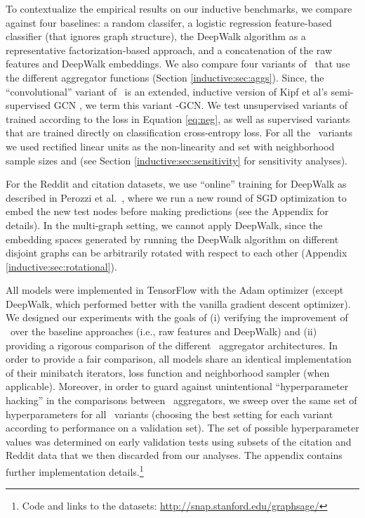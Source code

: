 To contextualize the empirical results on our inductive benchmarks, we compare against four baselines: 
a random classifer, a logistic regression feature-based classifier (that ignores graph structure), the DeepWalk algorithm \cite{perozzi2014deepwalk} as a representative factorization-based approach, and a
concatenation of the raw features and DeepWalk embeddings.
We also compare four variants of \name\ that use the different aggregator functions (Section \ref{inductive:sec:aggs}).
Since, the ``convolutional'' variant of \name\ is an extended, inductive version of Kipf et al's semi-supervised GCN \cite{kipf2016semi}, we term this variant \name-GCN.
We test unsupervised variants of \name\, trained according to the loss in Equation \eqref{eq:neg}, as well as supervised variants that are trained directly on classification cross-entropy loss.
For all the \name\ variants we used rectified linear units as the non-linearity and set  with neighborhood sample sizes  and  (see Section \ref{inductive:sec:sensitivity} for sensitivity analyses).

For the Reddit and citation datasets, we use ``online'' training for DeepWalk as described in Perozzi et al.~\cite{perozzi2014deepwalk}, where we run a new round of SGD optimization to embed the new test nodes before making predictions (see the Appendix for details).
In the multi-graph setting, we cannot apply DeepWalk, since the embedding spaces generated by running the DeepWalk algorithm on different disjoint graphs can be arbitrarily rotated with respect to each other (Appendix \ref{inductive:sec:rotational}). 



All models were implemented in TensorFlow \cite{abadi2016tensorflow} with the Adam optimizer \cite{kingma2014adam} (except DeepWalk, which performed better with the vanilla gradient descent optimizer). 
We designed our experiments with the goals of (i) verifying the improvement of \name\ over the baseline approaches (i.e., raw features and DeepWalk) and (ii) providing a rigorous comparison of the different \name\ aggregator architectures. 
In order to provide a fair comparison, all models share an identical implementation of their minibatch iterators, loss function and neighborhood sampler (when applicable). 
Moreover, in order to guard against unintentional ``hyperparameter hacking'' in the comparisons between \name\ aggregators, we sweep over the same set of hyperparameters for all \name\ variants (choosing the best setting for each variant according to performance on a validation set). 
The set of possible hyperparameter values was determined on early validation tests using subsets of the citation and Reddit data that we then discarded from our analyses. 
The appendix contains further implementation details.\footnote{Code and links to the datasets:  \url{http://snap.stanford.edu/graphsage/}}




